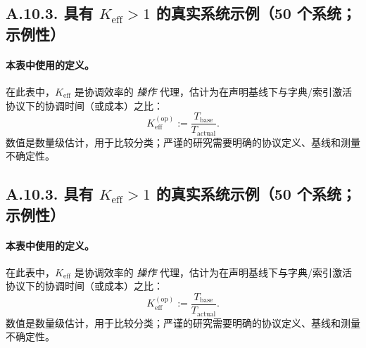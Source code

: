 \documentclass[11pt,a4paper]{article}
\newcommand{\Keff}{K_{\mathrm{eff}}}
\begin{document}
	\subsection*{A.10.3. 具有 $\Keff>1$ 的真实系统示例（50 个系统；示例性）}
	
	\paragraph{本表中使用的定义。}
	在此表中，$K_{\mathrm{eff}}$ 是协调效率的 \emph{操作} 代理，估计为在声明基线下与字典/索引激活协议下的协调时间（或成本）之比：
	$$
	K_{\mathrm{eff}}^{(\mathrm{op})} := \frac{T_{\mathrm{base}}}{T_{\mathrm{actual}}}.
	$$
	数值是数量级估计，用于比较分类；严谨的研究需要明确的协议定义、基线和测量不确定性。
	
	
\subsection*{A.10.3. 具有 $\Keff>1$ 的真实系统示例（50 个系统；示例性）}


\paragraph{本表中使用的定义。}
在此表中，$K_{\mathrm{eff}}$ 是协调效率的 \emph{操作} 代理，估计为在声明基线下与字典/索引激活协议下的协调时间（或成本）之比：
$$
K_{\mathrm{eff}}^{(\mathrm{op})} := \frac{T_{\mathrm{base}}}{T_{\mathrm{actual}}}.
$$
数值是数量级估计，用于比较分类；严谨的研究需要明确的协议定义、基线和测量不确定性。
\end{document}
